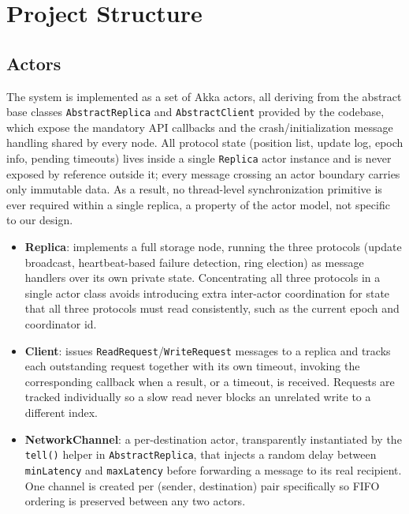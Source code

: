 \section{Project Structure}


\subsection{Actors}

The system is implemented as a set of Akka actors, all deriving from the abstract base classes
\texttt{AbstractReplica} and \texttt{AbstractClient} provided by the codebase, which expose the
mandatory API callbacks and the crash/initialization message handling shared by every node. All
protocol state (position list, update log, epoch info, pending timeouts) lives inside a single
\texttt{Replica} actor instance and is never exposed by reference outside it; every message crossing an actor boundary
carries only immutable data. As a result, no thread-level synchronization primitive is ever required within a single replica, a property of the actor
model, not specific to our design. 

\begin{itemize}[leftmargin=*]
  \item \textbf{Replica}: implements a full storage node, running the three protocols (update broadcast, heartbeat-based failure detection, ring election) as
  message handlers over its own private state. Concentrating all three protocols in a single actor
  class avoids introducing extra inter-actor
  coordination for state that all three protocols must read consistently, such as the current epoch
  and coordinator id.

  \item \textbf{Client}: issues \texttt{ReadRequest}/\texttt{WriteRequest} messages to a replica and
  tracks each outstanding request together with its own timeout, invoking the corresponding callback
  when a result, or a timeout, is received. Requests are tracked individually so a slow read never blocks an unrelated write to a different index.

  \item \textbf{NetworkChannel}: a per-destination actor, transparently instantiated by the
  \texttt{tell()} helper in \texttt{AbstractReplica}, that injects a random delay between
  \texttt{minLatency} and \texttt{maxLatency} before forwarding a message to its real recipient. One
  channel is created per (sender, destination) pair specifically so FIFO ordering is preserved between
  any two actors.

\end{itemize}

